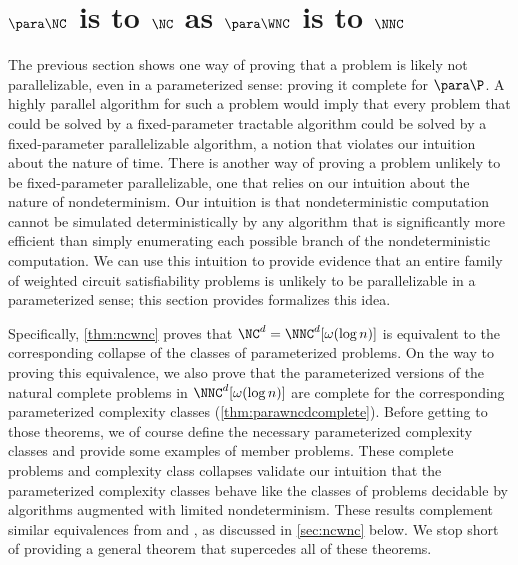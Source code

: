 \section{\texorpdfstring{$\para \NC$}{paraNC} is to \texorpdfstring{$\NC$}{NC} as \texorpdfstring{$\para \WNC$}{paraWNC} is to \texorpdfstring{$\NNC$}{NNC}}

%
%
%
The previous section shows one way of proving that a problem is likely not parallelizable, even in a parameterized sense: proving it complete for $\para \P$.
A highly parallel algorithm for such a problem would imply that every problem that could be solved by a fixed-parameter tractable algorithm could be solved by a fixed-parameter parallelizable algorithm, a notion that violates our intuition about the nature of time.
%
%
%
There is another way of proving a problem unlikely to be fixed-parameter parallelizable, one that relies on our intuition about the nature of nondeterminism.
Our intuition is that nondeterministic computation cannot be simulated deterministically by any algorithm that is significantly more efficient than simply enumerating each possible branch of the nondeterministic computation.
%
%
%
We can use this intuition to provide evidence that an entire family of weighted circuit satisfiability problems is unlikely to be parallelizable in a parameterized sense;
%
%
%
this section provides formalizes this idea.

%
%
%
Specifically, \autoref{thm:ncwnc} proves that $\NC^d = \NNC^d[\omega(\log n)]$ is equivalent to the corresponding collapse of the classes of parameterized problems.
On the way to proving this equivalence, we also prove that the parameterized versions of the natural complete problems in $\NNC^d[\omega(\log n)]$ are complete for the corresponding parameterized complexity classes (\autoref{thm:parawncdcomplete}).
Before getting to those theorems, we of course define the necessary parameterized complexity classes and provide some examples of member problems.
%
%
%
These complete problems and complexity class collapses validate our intuition that the parameterized complexity classes behave like the classes of problems decidable by algorithms augmented with limited nondeterminism.
%
%
These results complement similar equivalences from \autocite[Theorem~3.29]{fg06} and \autocite[Theorem~15]{cm14}, as discussed in \autoref{sec:ncwnc} below.
We stop short of providing a general theorem that supercedes all of these theorems.


